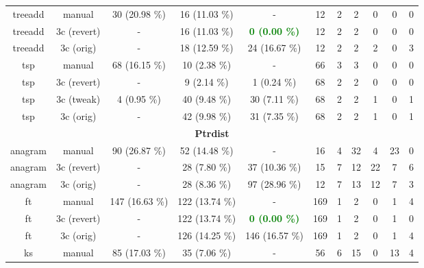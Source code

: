 \begin{tabular}{c|c|ccc|cccc|c|c}
\rowcolor[rgb]{0.8,0.8,0.8}
 treeadd & manual & 30 (20.98 \%) & 16 (11.03 \%) & - & 12 & 2 & 2 & 0 & 0 & 0 \\

\rowcolor[rgb]{0.8,0.8,0.8}
 treeadd & 3c (revert) & - & 16 (11.03 \%) & \textcolor{green}{\textbf{0 (0.00 \%)}} & 12 & 2 & 2 & 0 & 0 & 0 \\

\rowcolor[rgb]{0.8,0.8,0.8}
 treeadd & 3c (orig) & - & 18 (12.59 \%) & 24 (16.67 \%) & 12 & 2 & 2 & 2 & 0 & 3 \\

\rowcolor{white}
 tsp & manual & 68 (16.15 \%) & 10 (2.38 \%) & - & 66 & 3 & 3 & 0 & 0 & 0 \\

\rowcolor{white}
 tsp & 3c (revert) & - & 9 (2.14 \%) & 1 (0.24 \%) & 68 & 2 & 2 & 0 & 0 & 0 \\

\rowcolor{white}
 tsp & 3c (tweak) & 4 (0.95 \%) & 40 (9.48 \%) & 30 (7.11 \%) & 68 & 2 & 2 & 1 & 0 & 1 \\

\rowcolor{white}
 tsp & 3c (orig) & - & 42 (9.98 \%) & 31 (7.35 \%) & 68 & 2 & 2 & 1 & 0 & 1 \\

\midrule
\multicolumn{11}{c}{\textbf{Ptrdist}}\\
\midrule
\rowcolor[rgb]{0.8,0.8,0.8}
 anagram & manual & 90 (26.87 \%) & 52 (14.48 \%) & - & 16 & 4 & 32 & 4 & 23 & 0 \\

\rowcolor[rgb]{0.8,0.8,0.8}
 anagram & 3c (revert) & - & 28 (7.80 \%) & 37 (10.36 \%) & 15 & 7 & 12 & 22 & 7 & 6 \\

\rowcolor[rgb]{0.8,0.8,0.8}
 anagram & 3c (orig) & - & 28 (8.36 \%) & 97 (28.96 \%) & 12 & 7 & 13 & 12 & 7 & 3 \\

\rowcolor{white}
 ft & manual & 147 (16.63 \%) & 122 (13.74 \%) & - & 169 & 1 & 2 & 0 & 1 & 4 \\

\rowcolor{white}
 ft & 3c (revert) & - & 122 (13.74 \%) & \textcolor{green}{\textbf{0 (0.00 \%)}} & 169 & 1 & 2 & 0 & 1 & 0 \\

\rowcolor{white}
 ft & 3c (orig) & - & 126 (14.25 \%) & 146 (16.57 \%) & 169 & 1 & 2 & 0 & 1 & 4 \\

\rowcolor[rgb]{0.8,0.8,0.8}
 ks & manual & 85 (17.03 \%) & 35 (7.06 \%) & - & 56 & 6 & 15 & 0 & 13 & 4 \\


\end{tabular}
